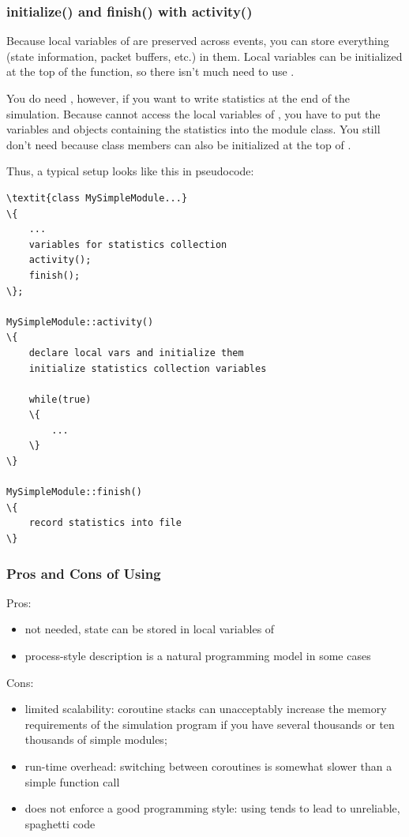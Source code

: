 \subsubsection{initialize() and finish() with activity()}


Because local variables of  are preserved across
events, you can store everything (state information, packet buffers,
etc.) in them. Local variables can be initialized at the top of the
 function, so there isn't much need to use
.


You do need , however, if you want to write statistics at
the end of the simulation. Because  cannot access
the local variables of , you have to put the variables
and objects containing the statistics into the module class.
You still don't need  because class members can also
be initialized at the top of .


Thus, a typical setup looks like this in pseudocode:


\begin{Verbatim}[commandchars=\\\{\}]
\textit{class MySimpleModule...}
\{
    ...
    variables for statistics collection
    activity();
    finish();
\};

MySimpleModule::activity()
\{
    declare local vars and initialize them
    initialize statistics collection variables

    while(true)
    \{
        ...
    \}
\}

MySimpleModule::finish()
\{
    record statistics into file
\}
\end{Verbatim}


\subsubsection{Pros and Cons of Using }


Pros:
\begin{itemize}
   \item{ not needed, state can be stored in local
       variables of }
   \item{process-style description is a natural programming model in some cases}
\end{itemize}

Cons:
\begin{itemize}
   \item{limited scalability: coroutine stacks can unacceptably increase the
       memory requirements of the simulation program if you have several
       thousands or ten thousands of simple modules;}
   \item{run-time overhead: switching between coroutines is somewhat slower
       than a simple function call}
   \item{does not enforce a good programming style: using 
       tends to lead to unreliable, spaghetti code}
\end{itemize}

